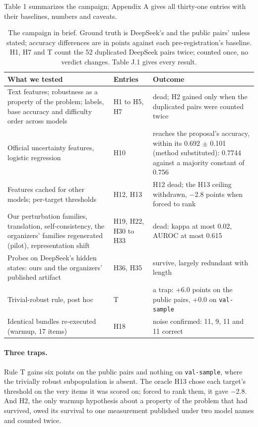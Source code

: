 \documentclass{article}
\begin{document}
Table 1 summarizes the campaign; Appendix A gives all thirty-one entries with their baselines, numbers and caveats.

\begin{table}[t]
\caption{The campaign in brief. Ground truth is DeepSeek's and the public pairs' unless stated; accuracy differences are in points against each pre-registration's baseline. H1, H7 and T count the 52 duplicated DeepSeek pairs twice; counted once, no verdict changes. Table J.1 gives every result.}
\label{tab:campaign}
\centering
\small
\begin{tabular}{@{}L{5.5cm}L{1.9cm}L{5.6cm}@{}}
\toprule
\textbf{What we tested} & \textbf{Entries} & \textbf{Outcome} \\
\midrule
Text features; robustness as a property of the problem; labels, base accuracy and difficulty order across models & H1 to H5, H7 & dead; H2 gained only when the duplicated pairs were counted twice \\
Official uncertainty features, logistic regression & H10 & reaches the proposal's accuracy, within its 0.692 $\pm$ 0.101 (method substituted): 0.7744 against a majority constant of 0.756 \\
Features cached for other models; per-target thresholds & H12, H13 & H12 dead; the H13 ceiling withdrawn, $-$2.8 points when forced to rank \\
Our perturbation families, translation, self-consistency, the organizers' families regenerated (pilot), representation shift & H19, H22, H30 to H33 & dead: kappa at most 0.02, AUROC at most 0.615 \\
Probes on DeepSeek's hidden states: ours and the organizers' published artifact & H36, H35 & survive, largely redundant with length \\
Trivial-robust rule, post hoc & T & a trap: +6.0 points on the public pairs, +0.0 on \texttt{val-sample} \\
Identical bundles re-executed (warmup, 17 items) & H18 & noise confirmed: 11, 9, 11 and 11 correct \\
\bottomrule
\end{tabular}
\end{table}

\paragraph{Three traps.}
Rule T gains six points on the public pairs and nothing on \texttt{val-sample}, where the trivially robust subpopulation is absent. The oracle H13 chose each target's threshold on the very items it was scored on; forced to rank them, it gave $-$2.8. And H2, the only warmup hypothesis about a property of the problem that had survived, owed its survival to one measurement published under two model names and counted twice.
\end{document}
